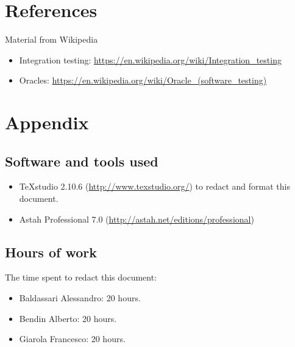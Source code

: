 \documentclass[a4paper,11pt]{report} %
\begin{document}
	\pagebreak
	\section{References}
		Material from Wikipedia
		\begin{itemize}
			\item Integration testing: \href{https://en.wikipedia.org/wiki/Integration_testing}{https://en.wikipedia.org/wiki/Integration\_testing}
			\item Oracles: \href{https://en.wikipedia.org/wiki/Oracle_(software_testing)}{https://en.wikipedia.org/wiki/Oracle\_(software\_testing)}
		\end{itemize}
	
	\section{Appendix}
	
	\subsection{Software and tools used}
	\begin{itemize}
		\item TeXstudio 2.10.6 (\href{http://www.texstudio.org/}{http://www.texstudio.org/}) to redact and format this document.
		\item Astah Professional 7.0 (\href{http://astah.net/editions/professional}{http://astah.net/editions/professional}) 
	\end{itemize}
	
	\subsection{Hours of work} The time spent to redact this document:
	\begin{itemize}
		\item Baldassari Alessandro: 20 hours.
		\item Bendin Alberto: 20 hours.
		\item Giarola Francesco: 20 hours.
	\end{itemize}
\end{document}
